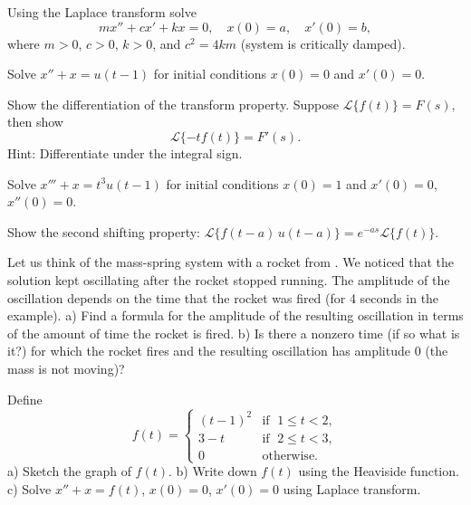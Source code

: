 \documentclass[12pt]{book}
\begin{document}
\begin{exercise}
Using the Laplace transform solve
\begin{equation*}
m x'' + c x' + k x = 0 , \quad x(0) = a, \quad x'(0) = b ,
\end{equation*}
where $m > 0$, $c > 0$, $k > 0$, and
$c^2 = 4km$ (system is critically damped).
\end{exercise}

\begin{exercise}
Solve $x'' + x = u(t-1)$ for initial conditions $x(0) = 0$ and $x'(0) = 0$.
\end{exercise}

\begin{exercise}
Show the differentiation of the transform property.  Suppose
$\mathcal{L} \{ f(t) \} = F(s)$, then show
\begin{equation*}
\mathcal{L} \{ -t f(t) \} = F'(s) .
\end{equation*}
Hint: Differentiate under the integral sign.
\end{exercise}

\begin{exercise}
Solve $x''' + x = t^3 u(t-1)$ for initial conditions $x(0) = 1$ and $x'(0) =
0$, $x''(0) = 0$.
\end{exercise}

\begin{exercise}
Show the second shifting property: 
$\mathcal{L} \{ f(t-a) \, u(t-a) \} = e^{-as} \mathcal{L} \{ f(t) \}$.
\end{exercise}

\begin{exercise}
Let us think of the mass-spring system with a rocket from
.  We noticed that the solution kept oscillating
after the rocket stopped running.  The amplitude of the oscillation depends
on the time that the rocket was fired (for 4 seconds in the example).  a)
Find a formula for the amplitude of the resulting oscillation
in terms of the amount of time the rocket is fired.  b) Is there
a nonzero time (if so what is it?)
for which the rocket fires and the resulting oscillation
has amplitude 0 (the mass is not moving)?
\end{exercise}

\begin{exercise}
Define
\begin{equation*}
f(t) =
\begin{cases}
{(t-1)}^2 & \text{if } \; 1 \leq t < 2, \\
3-t & \text{if } \; 2 \leq t < 3, \\
0 & \text{otherwise} .
\end{cases}
\end{equation*}
a) Sketch the graph of $f(t)$.
b) Write down $f(t)$ using the Heaviside function.
c) Solve $x''+x=f(t)$, $x(0)=0$, $x'(0) = 0$ using Laplace transform.
\end{exercise}
\end{document}
